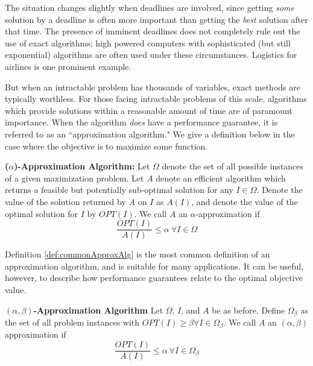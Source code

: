 \documentclass[12pt]{article}
\begin{document}
The situation changes slightly when deadlines are involved, since getting \textit{some} solution by a deadline is often more important than getting the \textit{best} solution after that time. 
The presence of imminent deadlines does not completely rule out the use of exact algorithms; high powered computers with sophisticated (but still exponential) algorithms are often used under these circumstances. 
Logistics for airlines is one prominent example.

But when an intractable problem has thousands of variables, exact methods are typically worthless. 
For those facing intractable problems of this scale, algorithms which provide solutions within a reasonable amount of time are of paramount importance.  
When the algorithm \textit{does} have a performance guarantee, it is referred to as an ``approximation algorithm."
We give a definition below in the case where the objective is to maximize some function. 

\begin{definition}
\textbf{($\alpha$)-Approximation Algorithm: } Let $\Omega$ denote the set of all possible instances of a given maximization problem. 
Let $A$ denote an efficient algorithm which returns a feasible but potentially sub-optimal solution for any $I \in \Omega$. 
Denote the value of the solution returned by $A$ on $I$ as $A(I)$, and denote the value of the optimal solution for $I$ by $OPT(I)$. We call $A$ an $\alpha$-approximation if
\begin{equation*}
\frac{OPT(I)}{A(I)} \leq \alpha ~ \forall I \in \Omega
\end{equation*}
\label{def:commonApproxAlg}
\end{definition}

Definition \ref{def:commonApproxAlg} is the most common definition of an approximation algorithm, and is suitable for many applications. It can be useful, however, to describe how performance guarantees relate to the optimal objective value. 
\begin{definition}
\textbf{$(\alpha,\beta)$-Approximation Algorithm } Let $\Omega$, $I$, and $A$ be as before. 
Define $\Omega_\beta$ as the set of all problem instances with $OPT(I) \geq \beta \forall I \in \Omega_\beta$.
We call $A$ an $(\alpha,\beta)$ approximation if 
\begin{equation*}
\frac{OPT(I)}{A(I)} \leq \alpha ~ \forall I \in \Omega_{\beta}
\end{equation*}
\label{def:twoParamApproxAlg}
\end{definition}
\end{document}
